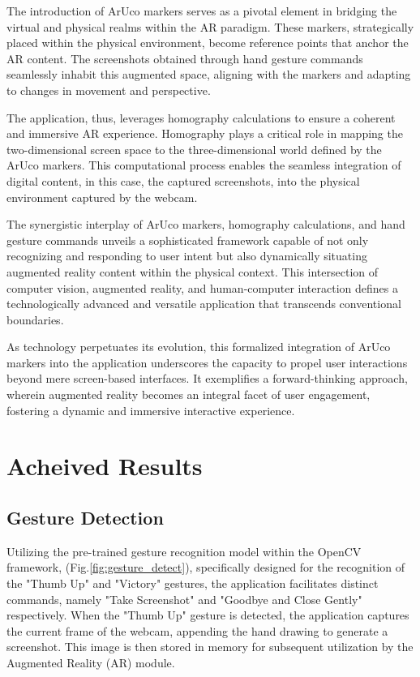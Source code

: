\documentclass[journal]{IEEEtran}
\begin{document}
The introduction of ArUco markers serves as a pivotal element in bridging the virtual and physical realms within the AR paradigm. 
These markers, strategically placed within the physical environment, become reference points that anchor the AR content. 
The screenshots obtained through hand gesture commands seamlessly inhabit this augmented space, aligning with the markers and adapting 
to changes in movement and perspective.

The application, thus, leverages homography calculations to ensure a coherent and immersive AR experience. Homography plays a 
critical role in mapping the two-dimensional screen space to the three-dimensional world defined by the ArUco markers. This computational 
process enables the seamless integration of digital content, in this case, the captured screenshots, into the physical environment 
captured by the webcam.

The synergistic interplay of ArUco markers, homography calculations, and hand gesture commands unveils a sophisticated framework 
capable of not only recognizing and responding to user intent but also dynamically situating augmented reality content within the 
physical context. This intersection of computer vision, augmented reality, and human-computer interaction defines a technologically 
advanced and versatile application that transcends conventional boundaries.

As technology perpetuates its evolution, this formalized integration of ArUco markers into the application underscores the capacity 
to propel user interactions beyond mere screen-based interfaces. It exemplifies a forward-thinking approach, wherein augmented reality 
becomes an integral facet of user engagement, fostering a dynamic and immersive interactive experience.


\section{Acheived Results}
\subsection*{Gesture Detection}
Utilizing the pre-trained gesture recognition model within the OpenCV framework, (Fig.\ref{fig:gesture_detect}), specifically designed for the recognition of the 
"Thumb Up" and "Victory" gestures, the application facilitates distinct commands, namely "Take Screenshot" and "Goodbye and Close Gently" 
respectively. When the "Thumb Up" gesture is detected, the application captures the current frame of the webcam, appending the hand 
drawing to generate a screenshot. This image is then stored in memory for subsequent utilization by the Augmented Reality (AR) module.
\end{document}
